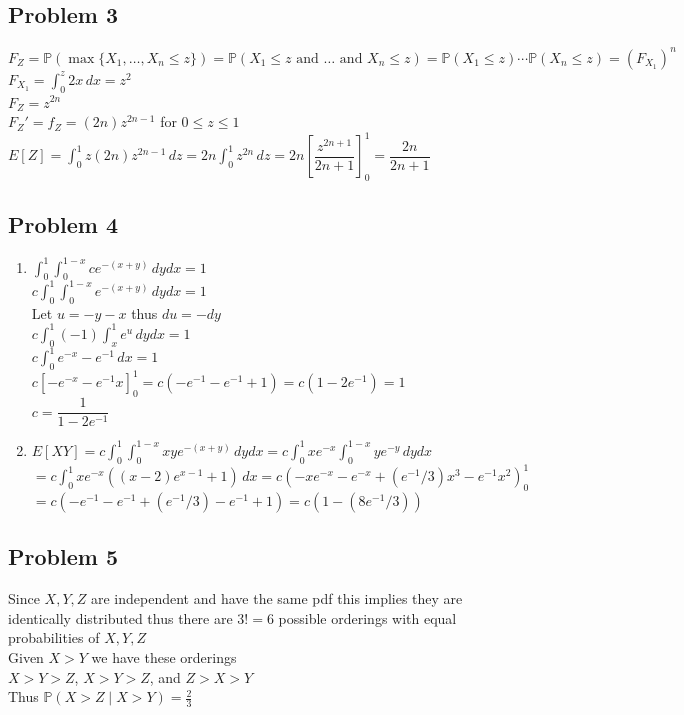 \documentclass[12pt, letterpaper]{article}
\theoremstyle{definition}
\renewcommand{\P}{\mathbb{P}}
\renewcommand{\t}[1]{\text{#1}}
\begin{document}
\newpage
\subsection*{Problem 3}
$F_Z=\P(\max\{X_1,\dots,X_n \leq z\})=\P(X_1 \leq z \t{ and } \dots \t{ and } X_n \leq z)=\P(X_1 \leq z)\cdots\P(X_n \leq z)=(F_{X_1})^n$\\
$F_{X_1}=\displaystyle\int_{0}^z2x\,dx=z^2$\\[1 ex]
$F_Z=z^{2n}$\\
$F_Z'=f_Z=(2n)z^{2n-1}$ for $0 \leq z \leq 1$\\
$E[Z]=\displaystyle\int_0^1z(2n)z^{2n-1}\,dz=2n\displaystyle\int_0^1z^{2n}\,dz=2n\left[ \dfrac{z^{2n+1}}{2n+1} \right]^1_0=\dfrac{2n}{2n+1}$

\newpage
\subsection*{Problem 4}
\begin{enumerate}
    \item $\displaystyle\int_{0}^1\int_{0}^{1-x}ce^{-(x+y)}\,dydx=1$\\
    $c\displaystyle\int_{0}^1\int_{0}^{1-x}e^{-(x+y)}\,dydx=1$\\[1 ex]
    Let $u=-y-x$ thus $du=-dy$\\
    $c\displaystyle\int_{0}^1(-1)\int_{x}^{1}e^{u}\,dydx=1$\\
    $c\displaystyle\int_{0}^1e^{-x}-e^{-1}\,dx=1$\\
    $c\left[ -e^{-x}-e^{-1}x \right]^1_0=c(-e^{-1}-e^{-1}+1)=c(1-2e^{-1})=1$\\
    $c=\dfrac{1}{1-2e^{-1}}$
    \item $E[XY]=c\displaystyle\int_0^1\int_0^{1-x}xye^{-(x+y)}\,dydx=c\displaystyle\int_0^1xe^{-x}\int_0^{1-x}ye^{-y}\,dydx$\\
    $=c\displaystyle\int_0^1xe^{-x}((x-2)e^{x-1}+1)\,dx=c\left( -xe^{-x}-e^{-x}+(e^{-1}/3)x^3-e^{-1}x^2 \right)^1_0$\\
    $=c(-e^{-1}-e^{-1}+(e^{-1}/3)-e^{-1}+1)=c(1-(8e^{-1}/3))$
\end{enumerate}

\newpage
\subsection*{Problem 5}
Since $X,Y,Z$ are independent and have the same pdf this implies they are identically distributed thus there are $3!=6$ possible orderings with equal probabilities of $X,Y,Z$\\
Given $X>Y$ we have these orderings\\
$X>Y>Z$, $X>Y>Z$, and $Z>X>Y$\\
Thus $\P(X>Z \mid X>Y)=\frac{2}{3}$
\end{document}
